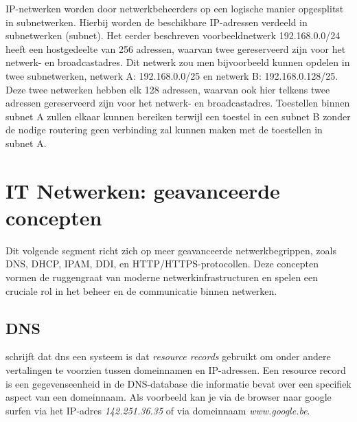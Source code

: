 IP-netwerken worden door netwerkbeheerders op een logische manier opgesplitst in subnetwerken. Hierbij worden de beschikbare IP-adressen verdeeld in subnetwerken (subnet). Het eerder beschreven voorbeeldnetwerk 192.168.0.0/24 heeft een hostgedeelte van 256 adressen, waarvan twee gereserveerd zijn voor het netwerk- en broadcastadres. Dit netwerk zou men bijvoorbeeld kunnen opdelen in twee subnetwerken, netwerk A: 192.168.0.0/25 en netwerk B: 192.168.0.128/25. Deze twee netwerken hebben elk 128 adressen, waarvan ook hier telkens twee adressen gereserveerd zijn voor het netwerk- en broadcastadres.
Toestellen binnen subnet A zullen elkaar kunnen bereiken terwijl een toestel in een subnet B zonder de nodige routering geen verbinding zal kunnen maken met de toestellen in subnet A.

\section{IT Netwerken: geavanceerde concepten}
Dit volgende segment richt zich op meer geavanceerde netwerkbegrippen, zoals DNS, DHCP, IPAM, DDI, en HTTP/HTTPS-protocollen. Deze concepten vormen de ruggengraat van moderne netwerkinfrastructuren en spelen een cruciale rol in het beheer en de communicatie binnen netwerken.

\subsection{DNS}
\textcite{Mockapetris1987} schrijft dat \acrshort{dns} een systeem is dat \textit{resource records} gebruikt om onder andere vertalingen te voorzien tussen domeinnamen en IP-adressen. Een resource record is een gegevenseenheid in de DNS-database die informatie bevat over een specifiek aspect van een domeinnaam. Als voorbeeld kan je via de browser naar google surfen via het IP-adres \textit{142.251.36.35} of via domeinnaam \textit{www.google.be}. 

